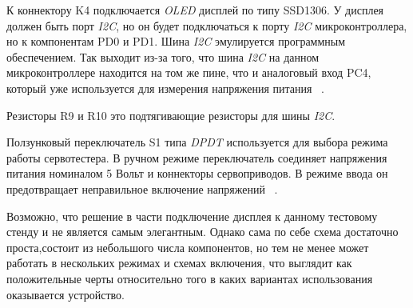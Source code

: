 К коннектору K4 подключается \textit{OLED} дисплей по типу SSD1306.  У
дисплея должен быть порт \textit{I2C}, но он будет подключаться к
порту \textit{I2C} микроконтроллера, но к компонентам PD0 и PD1. Шина
\textit{I2C} эмулируется программным обеспечением. Так выходит из-за
того, что шина \textit{I2C} на данном микроконтроллере находится на
том же пине, что и аналоговый вход PC4, который уже используется для
измерения напряжения питания ~\cite{Elector521}.

Резисторы R9 и R10 это подтягивающие резисторы для шины \textit{I2C}.

Ползунковый переключатель S1 типа \textit{DPDT} используется для
выбора режима работы сервотестера. В ручном режиме переключатель
соединяет напряжения питания номиналом 5 Вольт и коннекторы
сервоприводов. В режиме ввода он предотвращает неправильное включение
напряжений ~\cite{Elector521}.

Возможно, что решение в части подключение дисплея к данному тестовому
стенду и не является самым элегантным. Однако сама по себе схема
достаточно проста,состоит из небольшого числа компонентов, но тем не
менее может работать в нескольких режимах и схемах включения, что
выглядит как положительные черты относительно того в каких вариантах
использования оказывается устройство.




